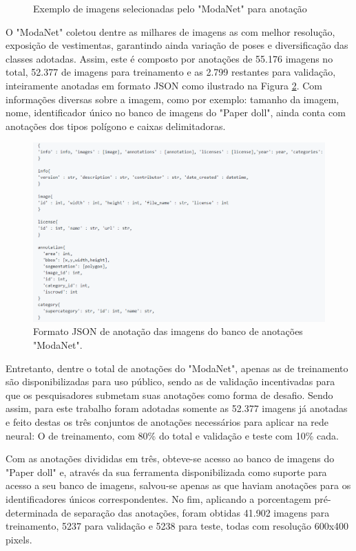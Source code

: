 \documentclass[12pt]{report}
\newcommand*{\captionsource}[2]{%
  \caption[{#1}]{%
    #1%
    \\\hspace{\linewidth}%
     \text{Fonte:}#2%
  }%
}
\begin{document}
\begin{figure}
\begin{subfigure}[b]{0.2\textwidth}
  \end{subfigure}
  \caption{Exemplo de imagens selecionadas pelo "ModaNet" para anotação}
  \label{fig:paperdoll-modanet}
\end{figure}

O "ModaNet" \cite{modanet} coletou dentre as milhares de imagens as com melhor resolução, exposição de vestimentas, garantindo ainda variação de poses e diversificação das classes adotadas. Assim, este é composto por anotações de 55.176 imagens no total, 52.377 de imagens para treinamento e as 2.799 restantes para validação, inteiramente anotadas em formato JSON como ilustrado na Figura \ref{fig:JSONformat}. Com informações diversas sobre a imagem, como por exemplo: tamanho da imagem, nome, identificador único no banco de imagens do "Paper doll", ainda conta com anotações dos tipos polígono e caixas delimitadoras.

\begin{figure}
    \centering
    \includegraphics[width=\textwidth]{images/JSONformat.png}
    \captionsource{Formato JSON de anotação das imagens do banco de anotações "ModaNet".}{ \protect\cite{modanetgit}}
    \label{fig:JSONformat}
\end{figure}

Entretanto, dentre o total de anotações do "ModaNet", apenas as de treinamento são disponibilizadas para uso público, sendo as de validação incentivadas para que os pesquisadores submetam suas anotações como forma de desafio. Sendo assim, para este trabalho foram adotadas somente as 52.377 imagens já anotadas e feito destas os três conjuntos de anotações necessários para aplicar na rede neural: O de treinamento, com 80\% do total e validação e teste com 10\% cada. 

Com as anotações divididas em três, obteve-se acesso ao banco de imagens do "Paper doll" e, através da sua ferramenta disponibilizada como suporte para acesso a seu banco de imagens, salvou-se apenas as que haviam anotações para os identificadores únicos correspondentes. No fim, aplicando a porcentagem pré-determinada de separação das anotações, foram obtidas 41.902 imagens para treinamento, 5237 para validação e 5238 para teste, todas com resolução 600x400 pixels.
\end{document}
